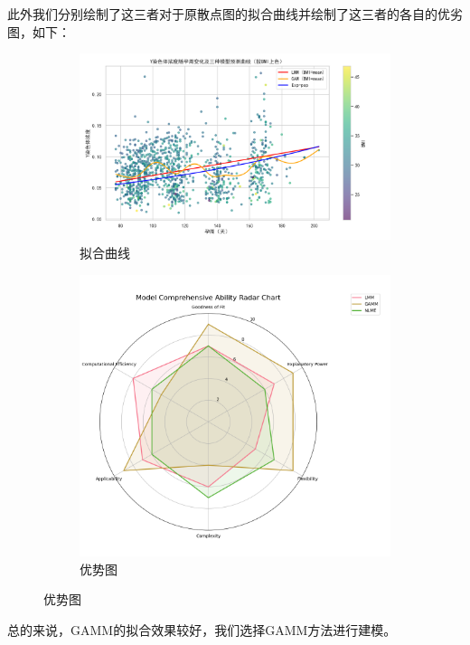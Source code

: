 \documentclass{article}
\begin{document}
此外我们分别绘制了这三者对于原散点图的拟合曲线并绘制了这三者的各自的优劣图，如下：
\begin{figure}[H]
    \centering
    \begin{subfigure}[b]{0.45\textwidth}  %
        \centering
        \includegraphics[width=\textwidth]{graph/y_vs_time_population_curves.png}  %
        \caption{拟合曲线}  %
        \label{fig:sub1}  %
    \end{subfigure}
    \hspace{0.05\textwidth}  %
    \begin{subfigure}[b]{0.45\textwidth}
        \centering
        \includegraphics[width=\textwidth]{graph/ability.png}
        \caption{优势图}
        \label{fig:sub2}
    \end{subfigure}
    \label{fig:two}  %
\end{figure}
总的来说，GAMM的拟合效果较好，我们选择GAMM方法进行建模。
\end{document}
